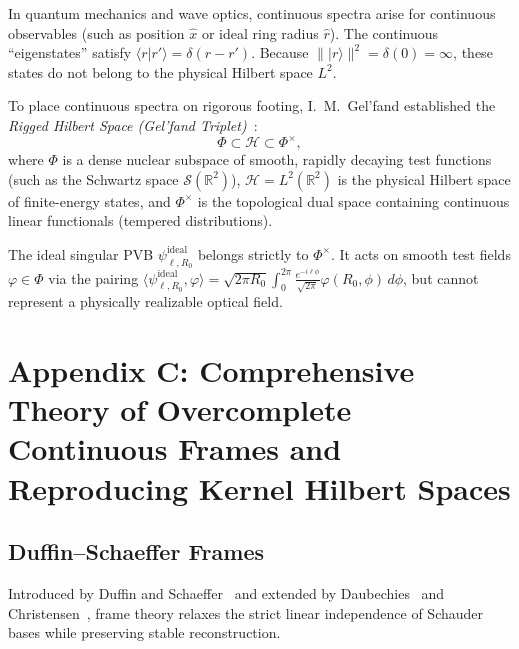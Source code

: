 \documentclass[11pt,a4paper]{article}
\begin{document}
In quantum mechanics and wave optics, continuous spectra arise for continuous observables (such as position $\hat{x}$ or ideal ring radius $\hat{r}$). The continuous ``eigenstates'' satisfy $\langle r | r' \rangle = \delta(r - r')$. Because $\||r\rangle\|^2 = \delta(0) = \infty$, these states do not belong to the physical Hilbert space $L^2$.

To place continuous spectra on rigorous footing, I.~M.~Gel'fand established the \emph{Rigged Hilbert Space (Gel'fand Triplet)}~\cite{Gelfand1964,Bohm1989}:
\begin{equation}
\Phi \subset \mathcal{H} \subset \Phi^\times,
\label{eq:app_gelfand_triplet}
\end{equation}
where $\Phi$ is a dense nuclear subspace of smooth, rapidly decaying test functions (such as the Schwartz space $\mathcal{S}(\mathbb{R}^2)$), $\mathcal{H} = L^2(\mathbb{R}^2)$ is the physical Hilbert space of finite-energy states, and $\Phi^\times$ is the topological dual space containing continuous linear functionals (tempered distributions).

The ideal singular PVB $\psi_{\ell, R_0}^{\text{ideal}}$ belongs strictly to $\Phi^\times$. It acts on smooth test fields $\varphi \in \Phi$ via the pairing $\langle \psi_{\ell, R_0}^{\text{ideal}}, \varphi \rangle = \sqrt{2\pi R_0} \int_0^{2\pi} \frac{e^{-i \ell \phi}}{\sqrt{2\pi}} \varphi(R_0, \phi) \, d\phi$, but cannot represent a physically realizable optical field.

\section{Appendix C: Comprehensive Theory of Overcomplete Continuous Frames and Reproducing Kernel Hilbert Spaces}
\label{app:frames}

\subsection{Duffin--Schaeffer Frames}

Introduced by Duffin and Schaeffer~\cite{Duffin1952} and extended by Daubechies~\cite{Daubechies1990} and Christensen~\cite{Christensen2016}, frame theory relaxes the strict linear independence of Schauder bases while preserving stable reconstruction.
\end{document}
